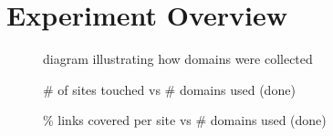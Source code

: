 \section{Experiment Overview} \label{oversky}

\begin{figure}
    \caption{diagram illustrating how domains were collected}
\end{figure}

\begin{figure}
    \caption{# of sites touched vs # domains used (done)}
\end{figure}

\begin{figure}
    \caption{\% links covered per site vs # domains used (done)}
\end{figure}


